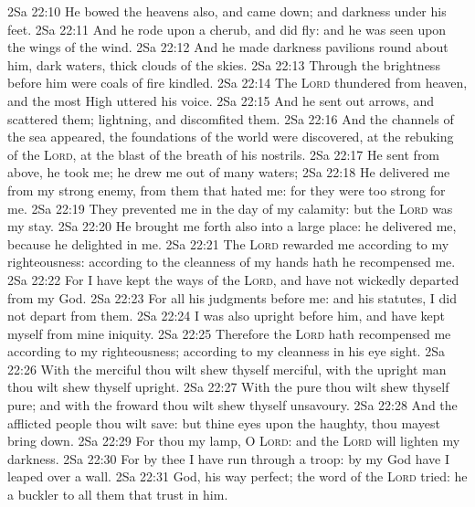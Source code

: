 \vs 2Sa 22:10 He bowed the heavens also, and came down; and darkness  under his feet.
\vs 2Sa 22:11 And he rode upon a cherub, and did fly: and he was seen upon the wings of the wind.
\vs 2Sa 22:12 And he made darkness pavilions round about him, dark waters,  thick clouds of the skies.
\vs 2Sa 22:13 Through the brightness before him were coals of fire kindled.
\vs 2Sa 22:14 The \textsc{Lord} thundered from heaven, and the most High uttered his voice.
\vs 2Sa 22:15 And he sent out arrows, and scattered them; lightning, and discomfited them.
\vs 2Sa 22:16 And the channels of the sea appeared, the foundations of the world were discovered, at the rebuking of the \textsc{Lord}, at the blast of the breath of his nostrils.
\vs 2Sa 22:17 He sent from above, he took me; he drew me out of many waters;
\vs 2Sa 22:18 He delivered me from my strong enemy,  from them that hated me: for they were too strong for me.
\vs 2Sa 22:19 They prevented me in the day of my calamity: but the \textsc{Lord} was my stay.
\vs 2Sa 22:20 He brought me forth also into a large place: he delivered me, because he delighted in me.
\vs 2Sa 22:21 The \textsc{Lord} rewarded me according to my righteousness: according to the cleanness of my hands hath he recompensed me.
\vs 2Sa 22:22 For I have kept the ways of the \textsc{Lord}, and have not wickedly departed from my God.
\vs 2Sa 22:23 For all his judgments  before me: and  his statutes, I did not depart from them.
\vs 2Sa 22:24 I was also upright before him, and have kept myself from mine iniquity.
\vs 2Sa 22:25 Therefore the \textsc{Lord} hath recompensed me according to my righteousness; according to my cleanness in his eye sight.
\vs 2Sa 22:26 With the merciful thou wilt shew thyself merciful,  with the upright man thou wilt shew thyself upright.
\vs 2Sa 22:27 With the pure thou wilt shew thyself pure; and with the froward thou wilt shew thyself unsavoury.
\vs 2Sa 22:28 And the afflicted people thou wilt save: but thine eyes  upon the haughty,  thou mayest bring  down.
\vs 2Sa 22:29 For thou  my lamp, O \textsc{Lord}: and the \textsc{Lord} will lighten my darkness.
\vs 2Sa 22:30 For by thee I have run through a troop: by my God have I leaped over a wall.
\vs 2Sa 22:31  God, his way  perfect; the word of the \textsc{Lord}  tried: he  a buckler to all them that trust in him.

